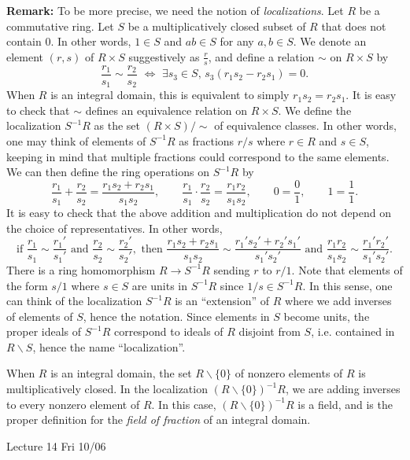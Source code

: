 \documentclass{article}
\newcommand{\add}[1]{{\color{blue} #1}}
\begin{document}
\noindent\textbf{Remark:} To be more precise, we need the notion of \textit{localizations}. Let $R$ be a commutative ring. Let $S$ be a multiplicatively closed subset of $R$ that does not contain $0$. In other words, $1\in S$ and $ab\in S$ for any $a,b\in S$. We denote an element $(r,s)$ of $R\times S$ suggestively as $\frac{r}{s}$, and define a relation $\sim$ on $R\times S$ by 
$$\frac{r_1}{s_1}\sim\frac{r_2}{s_2} \,\,\Longleftrightarrow\,\, \exists s_3\in S,\, s_3(r_1s_2 - r_2s_1) = 0.$$
When $R$ is an integral domain, this is equivalent to simply $r_1s_2 = r_2s_1$. It is easy to check that $\sim$ defines an equivalence relation on $R\times S$. We define the localization $S^{-1}R$ as the set $(R\times S)/\sim$ of equivalence classes. In other words, one may think of elements of $S^{-1}R$ as fractions $r/s$ where $r\in R$ and $s\in S$, keeping in mind that multiple fractions could correspond to the same elements. We can then define the ring operations on $S^{-1}R$ by
$$\frac{r_1}{s_1} + \frac{r_2}{s_2} = \frac{r_1s_2 + r_2s_1}{s_1s_2},\qquad \frac{r_1}{s_1} \cdot \frac{r_2}{s_2} = \frac{r_1r_2}{s_1s_2},\qquad 0 = \frac{0}{1},\qquad 1 = \frac{1}{1}.$$
It is easy to check that the above addition and multiplication do not depend on the choice of representatives. In other words, 
$$\mbox{if }\frac{r_1}{s_1}\sim\frac{r_1'}{s_1'}\mbox{ and }\frac{r_2}{s_2}\sim\frac{r_2'}{s_2'},\mbox{ then }\frac{r_1s_2 + r_2s_1}{s_1s_2}\sim\frac{r_1's_2' + r_2's_1'}{s_1's_2'}\mbox{ and }\frac{r_1r_2}{s_1s_2}\sim\frac{r_1'r_2'}{s_1's_2'}.$$
There is a ring homomorphism $R\rightarrow S^{-1}R$ sending $r$ to $r/1$. Note that elements of the form $s/1$ where $s\in S$ are units in $S^{-1}R$ since $1/s\in S^{-1}R$. In this sense, one can think of the localization $S^{-1}R$ is an ``extension'' of $R$ where we add inverses of elements of $S$, hence the notation. Since elements in $S$ become units, the proper ideals of $S^{-1}R$ correspond to ideals of $R$ disjoint from $S$, i.e. contained in $R\backslash S$, hence the name ``localization''.

When $R$ is an integral domain, the set $R\backslash\{0\}$ of nonzero elements of $R$ is multiplicatively closed. In the localization $(R\backslash\{0\})^{-1}R$, we are adding inverses to every nonzero element of $R$. In this case, $(R\backslash\{0\})^{-1}R$ is a field, and is the proper definition for the \textit{field of fraction} of an integral domain.

\begin{center}
    \add{Lecture 14 Fri 10/06}
\end{center}
\end{document}
